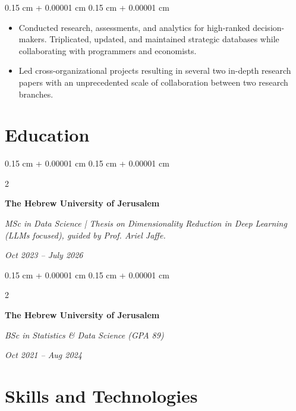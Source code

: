 \documentclass[10pt, letterpaper]{article}
\newenvironment{highlights}{
    \begin{itemize}[
        topsep=0.08 cm,
        parsep=0.08 cm,
        partopsep=0pt,
        itemsep=0pt,
        leftmargin=0.25 cm + 10pt
    ]
}{
    \end{itemize}
} %
\newenvironment{onecolentry}{
    \begin{adjustwidth}{
        0.15 cm + 0.00001 cm
    }{
        0.15 cm + 0.00001 cm
    }
}{
    \end{adjustwidth}
} %
\newenvironment{twocolentry}[2][]{
    \onecolentry
    \def\secondColumn{#2}
    \setcolumnwidth{\fill, 4 cm}
    \begin{paracol}{2}
}{
    \switchcolumn \raggedleft \secondColumn
    \end{paracol}
    \endonecolentry
} %
\begin{document}
        \vspace{0.08 cm}
        \begin{onecolentry}
            \begin{highlights}
                \item Conducted research, assessments, and analytics for high-ranked decision-makers. Triplicated, updated, and maintained strategic databases while collaborating with programmers and economists.
                \item Led cross-organizational projects resulting in several two in-depth research papers with an unprecedented scale of collaboration between two research branches.
            \end{highlights}
        \end{onecolentry}



    
    \section{Education}



        
        \begin{twocolentry}{
            
            
        \textit{Oct 2023 – July 2026}}
            \textbf{The Hebrew University of Jerusalem}

            \textit{MSc in Data Science | Thesis on Dimensionality Reduction in Deep Learning (LLMs focused), guided by Prof. Ariel Jaffe.}
        \end{twocolentry}



        \vspace{0.15 cm}

        \begin{twocolentry}{
            
            
        \textit{Oct 2021 – Aug 2024}}
            \textbf{The Hebrew University of Jerusalem}

            \textit{BSc in Statistics \& Data Science (GPA 89)}
        \end{twocolentry}




    
    \section{Skills and Technologies}
\end{document}

